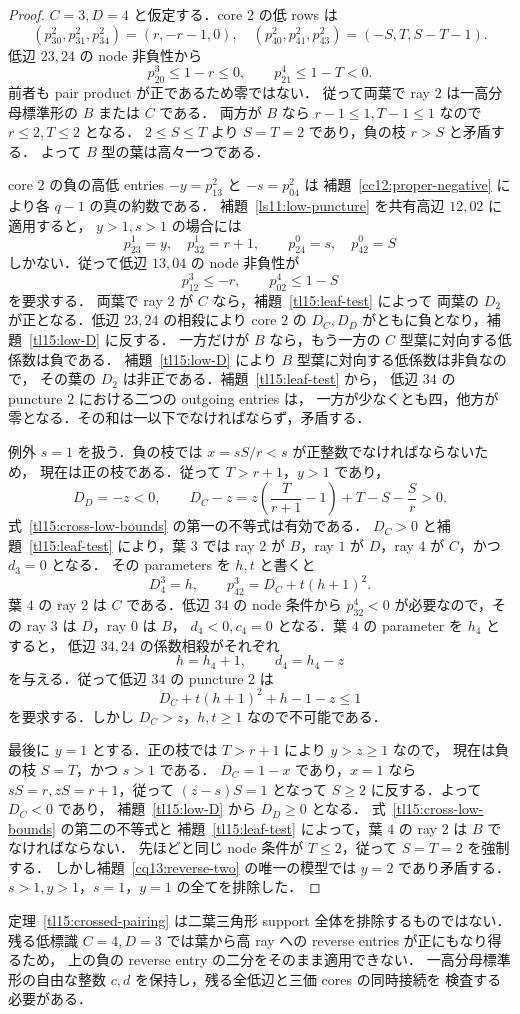 \begin{proof}
$C=3,D=4$ と仮定する．core $2$ の低 rows は
\[
 (p^2_{30},p^2_{31},p^2_{34})=(r,-r-1,0),\quad
 (p^2_{40},p^2_{41},p^2_{43})=(-S,T,S-T-1).
\]
低辺 $23,24$ の node 非負性から
\[
 p^3_{20}\le1-r\le0,\qquad p^4_{21}\le1-T<0.
\]
前者も pair product が正であるため零ではない．
従って両葉で ray $2$ は一高分母標準形の $B$ または $C$ である．
両方が $B$ なら $r-1\le1,T-1\le1$ なので $r\le2,T\le2$ となる．
$2\le S\le T$ より $S=T=2$ であり，負の枝 $r>S$ と矛盾する．
よって $B$ 型の葉は高々一つである．

core $2$ の負の高低 entries $-y=p^2_{13}$ と $-s=p^2_{04}$ は
補題~\ref{cc12:proper-negative} により各 $q-1$ の真の約数である．
補題~\ref{ls11:low-puncture} を共有高辺 $12,02$ に適用すると，
$y>1,s>1$ の場合には
\[
 p^1_{23}=y,\quad p^1_{32}=r+1,\qquad
 p^0_{24}=s,\quad p^0_{42}=S
\]
しかない．従って低辺 $13,04$ の node 非負性が
\begin{equation}\label{tl15:cross-low-bounds}
 p^3_{12}\le-r,\qquad p^4_{02}\le1-S
\end{equation}
を要求する．
両葉で ray $2$ が $C$ なら，補題~\ref{tl15:leaf-test} によって
両葉の $D_2$ が正となる．低辺 $23,24$ の相殺により
core $2$ の $D_C,D_D$ がともに負となり，補題~\ref{tl15:low-D} に反する．
一方だけが $B$ なら，もう一方の $C$ 型葉に対向する低係数は負である．
補題~\ref{tl15:low-D} により $B$ 型葉に対向する低係数は非負なので，
その葉の $D_2$ は非正である．補題~\ref{tl15:leaf-test} から，
低辺 $34$ の puncture $2$ における二つの outgoing entries は，
一方が少なくとも四，他方が零となる．その和は一以下でなければならず，矛盾する．

例外 $s=1$ を扱う．負の枝では $x=sS/r<s$ が正整数でなければならないため，
現在は正の枝である．従って $T>r+1$，$y>1$ であり，
\[
 D_D=-z<0,\qquad
 D_C-z=z\left(\frac{T}{r+1}-1\right)
          +T-S-\frac Sr>0.
\]
式~\eqref{tl15:cross-low-bounds} の第一の不等式は有効である．
$D_C>0$ と補題~\ref{tl15:leaf-test} により，葉 $3$ では
ray $2$ が $B$，ray $1$ が $D$，ray $4$ が $C$，かつ $d_3=0$ となる．
その parameters を $h,t$ と書くと
\[
 D^3_4=h,\qquad p^3_{42}=D_C+t(h+1)^2.
\]
葉 $4$ の ray $2$ は $C$ である．低辺 $34$ の node 条件から
$p^4_{32}<0$ が必要なので，その ray $3$ は $D$，ray $0$ は $B$，
$d_4<0,c_4=0$ となる．葉 $4$ の parameter を $h_4$ とすると，
低辺 $34,24$ の係数相殺がそれぞれ
\[
 h=h_4+1,\qquad d_4=h_4-z
\]
を与える．従って低辺 $34$ の puncture $2$ は
\[
 D_C+t(h+1)^2+h-1-z\le1
\]
を要求する．しかし $D_C>z$，$h,t\ge1$ なので不可能である．

最後に $y=1$ とする．正の枝では $T>r+1$ により $y>z\ge1$ なので，
現在は負の枝 $S=T$，かつ $s>1$ である．
$D_C=1-x$ であり，$x=1$ なら $sS=r,zS=r+1$，従って
$(z-s)S=1$ となって $S\ge2$ に反する．よって $D_C<0$ であり，
補題~\ref{tl15:low-D} から $D_D\ge0$ となる．
式~\eqref{tl15:cross-low-bounds} の第二の不等式と
補題~\ref{tl15:leaf-test} によって，葉 $4$ の ray $2$ は $B$ でなければならない．
先ほどと同じ node 条件が $T\le2$，従って $S=T=2$ を強制する．
しかし補題~\ref{cq13:reverse-two} の唯一の模型では $y=2$ であり矛盾する．
$s>1,y>1$，$s=1$，$y=1$ の全てを排除した．
\end{proof}

定理~\ref{tl15:crossed-pairing} は二葉三角形 support 全体を排除するものではない．
残る低標識 $C=4,D=3$ では葉から高 ray への reverse entries が正にもなり得るため，
上の負の reverse entry の二分をそのまま適用できない．
一高分母標準形の自由な整数 $c,d$ を保持し，残る全低辺と三価 cores の同時接続を
検査する必要がある．
